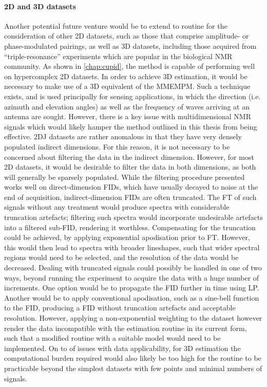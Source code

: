 \paragraph{\ac{2D} and \ac{3D} datasets}
Another potential future venture would be to extend to routine for the
consideration of other \ac{2D} datasets, such as those that comprise
amplitude- or phase-modulated pairings, as well as \ac{3D} datasets,
including those acquired from ``triple-resonance'' experiments which are
popular in the biological \ac{NMR} community\cite[Section 7.4]{Cavanagh2007}.
As shown in
\cref{chap:cupid}, the method is capable of performing well on hypercomplex
\ac{2D} datasets. In order to achieve \ac{3D} estimation, it would be necessary to
make use of a \ac{3D} equivalent of the \ac{MMEMPM}. Such a technique exists,
and is used principally for sensing applications, in which the direction (i.e.
azimuth and elevation angles) as well as the frequency of waves arriving at an
antenna are sought\cite{Yilmazer2006}. However, there is a key issue with
multidimensional \ac{NMR} signals which would likely hamper the method outlined
in this thesis from being effective. \ac{2DJ} datasets are rather anomalous in
that they have very densely populated indirect dimensions. For this reason, it
is not necessary to be concerned about filtering the data in the indirect
dimension. However, for most \ac{2D} datasets, it would be desirable to filter
the data in both dimensions, as both will generally be sparsely populated.
While the filtering procedure presented works well on direct-dimension
\acp{FID}, which have usually decayed to noise at the end
of acquisition, indirect-dimension \acp{FID} are often truncated. The \ac{FT}
of such signals without any treatment would produce spectra with considerable
truncation artefacts; filtering such spectra would incorporate undesirable
artefacts into a filtered sub-\ac{FID}, rendering it worthless.
Compensating for the truncation could be achieved, by applying exponential
apodisation prior to \ac{FT}. However, this would then lead to spectra with
broader lineshapes, such that wider spectral regions would need to be selected,
and the resolution of the data would be decreased.
Dealing with
truncated signals could possibly be handled in one of two ways, beyond running
the experiment to acquire the data with a huge number of increments. One
option would be to propagate the \ac{FID} further in time using \ac{LP}.
Another would be to apply conventional apodisation, such as a sine-bell
function to the \ac{FID}, producing a \ac{FID} without truncation artefacts and
acceptable resolution. However, applying a non-exponential weighting to the
dataset however render the data incompatible with the estimation routine in its
current form, such that a modified routine with a suitable model would need to
be implemented. On to of issues with data applicability, for \ac{3D}
estimation the computational burden required would also likely be too high for
the routine to be practicable beyond the simplest datasets with few points and
minimal numbers of signals.

